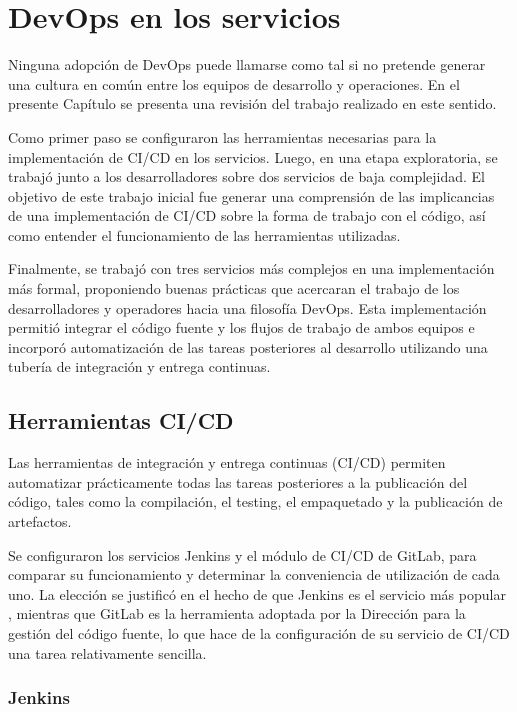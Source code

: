 \chapter{DevOps en los servicios}

Ninguna adopción de DevOps puede llamarse como tal si no pretende
generar una cultura en común entre los equipos de desarrollo y
operaciones. En el presente Capítulo se presenta una revisión del
trabajo realizado en este sentido.

Como primer paso se configuraron las herramientas necesarias para la
implementación de CI/CD en los servicios. Luego, en una etapa
exploratoria, se trabajó junto a los desarrolladores sobre dos
servicios de baja complejidad. El objetivo de este trabajo inicial fue
generar una comprensión de las implicancias de una implementación de
CI/CD sobre la forma de trabajo con el código, así como entender el
funcionamiento de las herramientas utilizadas.

Finalmente, se trabajó con tres servicios más complejos en una
implementación más formal, proponiendo buenas prácticas que acercaran
el trabajo de los desarrolladores y operadores hacia una filosofía
DevOps. Esta implementación permitió integrar el código fuente y los
flujos de trabajo de ambos equipos e incorporó automatización de las
tareas posteriores al desarrollo utilizando una tubería de integración
y entrega continuas.

\section{Herramientas CI/CD}

Las herramientas de integración y entrega continuas (CI/CD) permiten
automatizar prácticamente todas las tareas posteriores a la
publicación del código, tales como la compilación, el testing, el
empaquetado y la publicación de artefactos.

Se configuraron los servicios Jenkins y el módulo de CI/CD de GitLab,
para comparar su funcionamiento y determinar la conveniencia de
utilización de cada uno. La elección se justificó en el hecho de que
Jenkins es el servicio más popular
\cite{cicdcomparison}, mientras que
GitLab es la herramienta adoptada por la Dirección para la gestión del
código fuente, lo que hace de la configuración de su servicio de CI/CD
una tarea relativamente sencilla.

\subsection{Jenkins}

